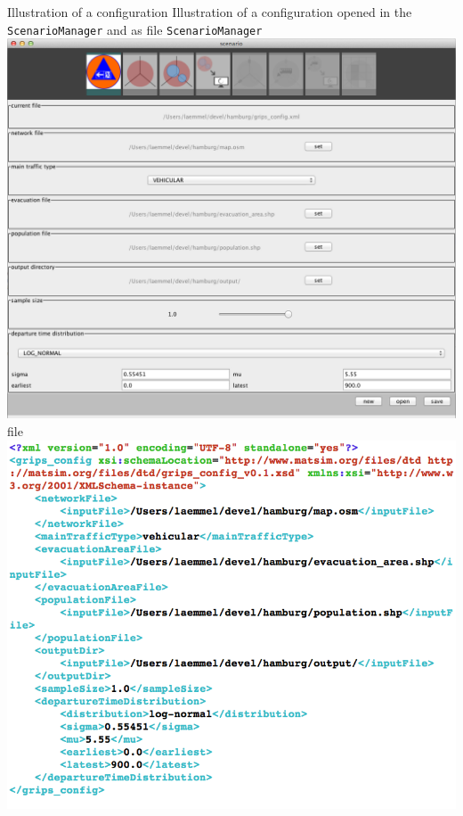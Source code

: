 \createfigure%
{Illustration of a configuration}%
{Illustration of a configuration opened in the \lstinline|ScenarioManager| and as  file}%
{\label{chap:evac:fig:sc_man}}%
{%
  \createsubfigure%
  {\lstinline|ScenarioManager|}%
{\includegraphics[width=.475\linewidth]{extending/figures/Evacuation/grips_config}}
  {}%
  {}%
  \createsubfigure%
  { file}%
{\includegraphics[width=.475\linewidth]{extending/figures/Evacuation/grips_config_xml}}
  {}%
  {}%
}%
  {}%

